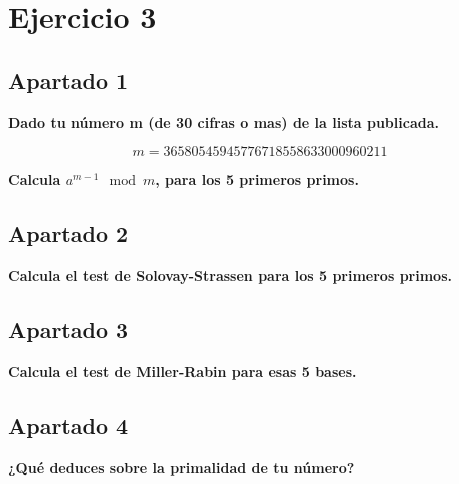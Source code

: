 \documentclass[a4paper]{article}
\title {\fbox{\Huge{\textbf{Ejercicio 3}}}}
\author {\fbox{Ana Buendía Ruiz-Azuaga}}
\begin{document}
\maketitle


\section{Ejercicio 3}
\subsection{Apartado 1}
\textbf{Dado tu número m (de 30 cifras o mas) de la lista publicada.}

$$m=36580545945776718558633000960211$$

\textbf{Calcula $a^{m-1} \mod m$, para los 5 primeros primos.}



\subsection{Apartado 2}
\textbf{Calcula el test de Solovay-Strassen para los 5 primeros primos.}


\subsection{Apartado 3}

\textbf{Calcula el test de Miller-Rabin para esas 5 bases.}



\subsection{Apartado 4}
\textbf{¿Qué deduces sobre la primalidad de tu número?}
\end{document}

